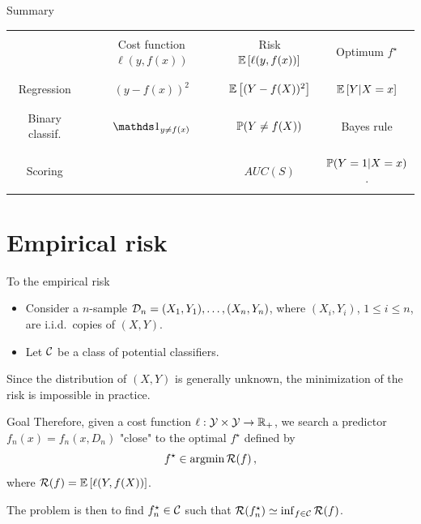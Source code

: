 \documentclass[xcolor={usenames,dvipsnames},handout]{beamer}
\begin{document}
\begin{frame}[shrink=20]{Summary}
\vfill
\begin{tabularx}{\textwidth}{c||c|c|c}
& & & \\
 & Cost function $\ell(y,f(x))$ & Risk $\E \left[ \ell(y,f(x)) \right]$ & Optimum $f^\star$ \\
 & & & \\
 \hline 
 \hline
 & & & \\
 Regression & $(y-f(x))^2$ & $ \E \left[ (Y-f(X))^2 \right] $ & $\E\left[ Y |X=x \right]$ \\
 & & & \\
 \hline
 & & & \\
 Binary classif. & $\one_{y\neq f(x)}$ & $\P(Y\neq f(X))$ & Bayes rule \\
 & & & \\
 \hline
 & & & \\
 Scoring &   & $AUC(S)$ & $\P(Y=1 |X=x)$. \\
 & & & \\
\end{tabularx}
\vfill
\end{frame}


\section{Empirical risk}


\begin{frame}{To the empirical risk}

\begin{itemize}
\item Consider a $n$-sample $\Dc_n = (X_1,Y_1),\hdots, (X_n,Y_n)$, where $(X_i,Y_i)$, $1\leq i \leq n$, are i.i.d.\ copies of $(X,Y)$.
\item Let \alert{$\Cc$ be a class of potential classifiers}. 
\end{itemize}
Since the distribution of $(X,Y)$ is generally unknown, the minimization of the risk is impossible in practice.
\begin{block}{Goal}
Therefore, given a cost function $\ell : \Yc \times \Yc \to \R_+$, we search a predictor $f_n (x) = f_n(x, D_n)$ "close" to \alert{the optimal  $f^\star$} defined by
$$f^\star \in \argmin \Rc(f)\,,$$ 
where $\Rc(f) = \E \left[ \ell(Y , f (X ))\right]$.
\end{block}
The problem is then to find $f_n^\star\in \Cc$ such that $\Rc(f_n^\star) \simeq \inf_{f\in \Cc} \Rc(f)$.

\end{frame}
\end{document}
